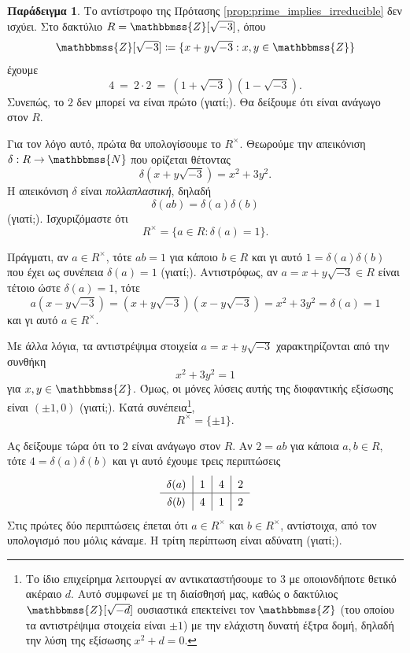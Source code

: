 \documentclass[12pt,a4paper,reqno]{amsart}
\theoremstyle{definition}
\newtheorem{example}[theorem]{Παράδειγμα}
\theoremstyle{remark}
\numberwithin{theorem}{section}
\numberwithin{exercise}{section}
\numberwithin{equation}{section}
\newcommand{\NN}{\mathbbmss{N}}
\newcommand{\ZZ}{\mathbbmss{Z}}
\renewcommand{\to}{\rightarrow}
\begin{document}
\begin{example}
    \label{ex:irreducible_not_prime}
    Το αντίστροφο της Πρότασης \ref{prop:prime_implies_irreducible} δεν ισχύει. Στο δακτύλιο $R = \ZZ[\sqrt{-3}]$, όπου 
    \[
    \ZZ[\sqrt{-3}] \coloneqq \{x + y\sqrt{-3} : x, y \in \ZZ\}
    \]
    έχουμε 
    \[
    4 \ = \ 2 \cdot 2 \ = \ (1 + \sqrt{-3})(1 - \sqrt{-3}).
    \]
    Συνεπώς, το $2$ δεν μπορεί να είναι πρώτο (γιατί;). Θα δείξουμε ότι είναι ανάγωγο στον $R$.

    Για τον λόγο αυτό, πρώτα θα υπολογίσουμε το $R^\times$. Θεωρούμε την απεικόνιση $\delta : R \to \NN$ που ορίζεται θέτοντας 
    \[
    \delta(x + y\sqrt{-3}) = x^2 + 3y^2.
    \]
    Η απεικόνιση $\delta$ είναι \emph{πολλαπλαστική}, δηλαδή 
    \[
    \delta(ab) = \delta(a)\delta(b)
    \]
    (γιατί;). Ισχυριζόμαστε ότι 
    \[
    R^\times = \{a \in R : \delta(a) = 1\}.
    \]

    Πράγματι, αν $a \in R^\times$, τότε $ab =1$ για κάποιο $b \in R$ και γι αυτό $1 = \delta(a)\delta(b)$ που έχει ως συνέπεια $\delta(a) = 1$ (γιατί;). Αντιστρόφως, αν $a = x + y\sqrt{-3} \in R$ είναι τέτοιο ώστε $\delta(a) = 1$, τότε 
    \[
    a(x - y\sqrt{-3}) = (x + y\sqrt{-3})(x - y\sqrt{-3}) = x^2 + 3y^2 = \delta(a) = 1
    \]
    και γι αυτό $a \in R^\times$.

    Με άλλα λόγια, τα αντιστρέψιμα στοιχεία $a = x + y\sqrt{-3}$ χαρακτηρίζονται από την συνθήκη 
    \[
    x^2 + 3y^2 = 1
    \]
    για $x, y \in \ZZ$. Όμως, οι μόνες λύσεις αυτής της διοφαντικής εξίσωσης είναι $(\pm1,0)$ (γιατί;). Κατά συνέπεια\footnote{Το ίδιο επιχείρημα λειτουργεί αν αντικαταστήσουμε το $3$ με οποιονδήποτε θετικό ακέραιο $d$. Αυτό συμφωνεί με τη διαίσθησή μας, καθώς ο δακτύλιος $\ZZ[\sqrt{-d}]$ ουσιαστικά επεκτείνει τον $\ZZ$ (του οποίου τα αντιστρέψιμα στοιχεία είναι $\pm1$) με την ελάχιστη δυνατή έξτρα δομή, δηλαδή  την λύση της εξίσωσης $x^2 + d = 0$.},
    \[
    R^\times = \{\pm1\}.
    \]

    Ας δείξουμε τώρα ότι το $2$ είναι ανάγωγο στον $R$. Αν $2 = ab$ για κάποια $a, b \in R$, τότε $4 = \delta(a)\delta(b)$ και γι αυτό έχουμε τρεις περιπτώσεις
    \[
    \renewcommand{\arraystretch}{1.3} 
    \begin{tabular}{c|c|c|c}
    $\delta(a)$ & $1$ & $4$ & $2$\\ \hline
    $\delta(b)$ & $4$ & $1$ & $2$
    \end{tabular}
    \]
    Στις πρώτες δύο περιπτώσεις έπεται ότι $a \in R^\times$ και $b \in R^\times$, αντίστοιχα, από τον υπολογισμό που μόλις κάναμε. Η τρίτη περίπτωση είναι αδύνατη (γιατί;).
\end{example}
\end{document}
